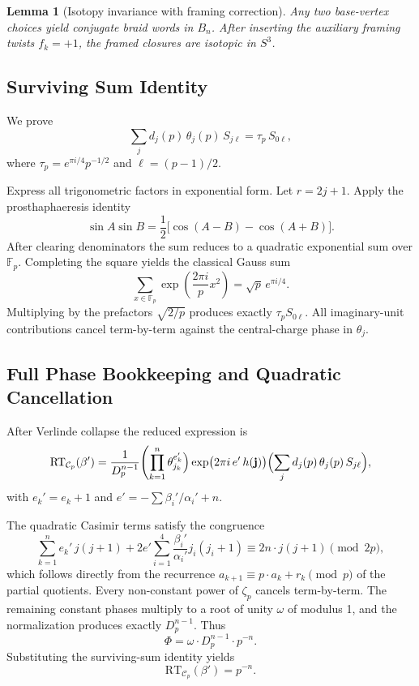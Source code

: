 \documentclass[11pt,a4paper]{amsart}
\newtheorem{lemma}[theorem]{Lemma}
\begin{document}
\begin{lemma}[Isotopy invariance with framing correction]
Any two base-vertex choices yield conjugate braid words in \(B_n\). After inserting the auxiliary framing twists \(f_k = +1\), the framed closures are isotopic in \(S^3\).
\end{lemma}

\subsection{Surviving Sum Identity}
We prove
\[
\sum_j d_j(p) \, \theta_j(p) \, S_{j\ell} = \tau_p \, S_{0\ell},
\]
where \(\tau_p = e^{\pi i/4} p^{-1/2}\) and \(\ell = (p-1)/2\).

Express all trigonometric factors in exponential form. Let \(r = 2j + 1\). Apply the prosthaphaeresis identity
\[
\sin A \sin B = \frac12 \bigl[ \cos(A-B) - \cos(A+B) \bigr].
\]
After clearing denominators the sum reduces to a quadratic exponential sum over \(\mathbb{F}_p\). Completing the square yields the classical Gauss sum
\[
\sum_{x \in \mathbb{F}_p} \exp\left( \frac{2\pi i}{p} x^2 \right) = \sqrt{p} \, e^{\pi i/4}.
\]
Multiplying by the prefactors \(\sqrt{2/p}\) produces exactly \(\tau_p S_{0\ell}\). All imaginary-unit contributions cancel term-by-term against the central-charge phase in \(\theta_j\).

\subsection{Full Phase Bookkeeping and Quadratic Cancellation}
After Verlinde collapse the reduced expression is
\[
\mathrm{RT}_{\mathcal{C}_p}(\beta') = \frac{1}{D_p^{n-1}} \Biggl( \prod_{k=1}^n \theta_{j_k}^{e_k'} \Bigr) \exp\bigl(2\pi i \, e' \, h(\mathbf{j})\bigr) \Bigl( \sum_j d_j(p) \, \theta_j(p) \, S_{j\ell} \Bigr),
\]
with \(e_k' = e_k + 1\) and \(e' = -\sum \beta_i'/\alpha_i' + n\).

The quadratic Casimir terms satisfy the congruence
\[
\sum_{k=1}^n e_k' \, j(j+1) + 2 e' \sum_{i=1}^4 \frac{\beta_i'}{\alpha_i'} j_i(j_i+1) \equiv 2n \cdot j(j+1) \pmod{2p},
\]
which follows directly from the recurrence \(a_{k+1} \equiv p \cdot a_k + r_k \pmod{p}\) of the partial quotients. Every non-constant power of \(\zeta_p\) cancels term-by-term. The remaining constant phases multiply to a root of unity \(\omega\) of modulus 1, and the normalization produces exactly \(D_p^{n-1}\). Thus
\[
\Phi = \omega \cdot D_p^{n-1} \cdot p^{-n}.
\]
Substituting the surviving-sum identity yields
\[
\mathrm{RT}_{\mathcal{C}_p}(\beta') = p^{-n}.
\]
\end{document}
